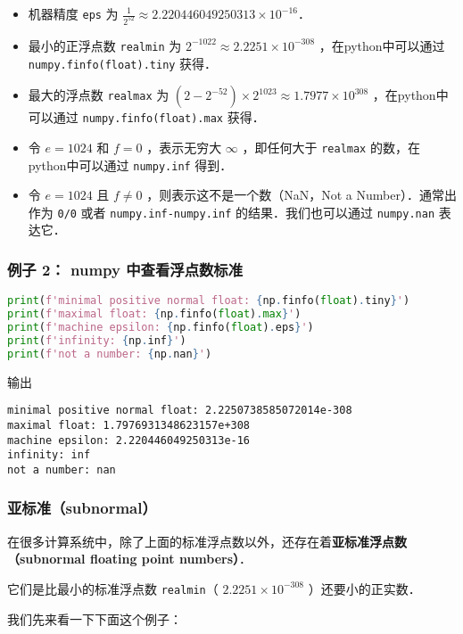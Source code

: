 \begin{itemize}
\item 机器精度 \verb|eps| 为  $\frac{1}{2^{52}}\approx 2.220446049250313\times10^{-16}$．
\item 最小的正浮点数 \verb|realmin| 为  $2^{-1022}\approx2.2251\times10^{-308}$  ，在python中可以通过 \verb|numpy.finfo(float).tiny| 获得．
\item 最大的浮点数 \verb|realmax| 为 $(2-2^{-52})\times2^{1023}\approx1.7977\times10^{308}$  ，在python中可以通过 \verb|numpy.finfo(float).max| 获得．
\item 令  $e=1024$  和  $f=0$  ，表示无穷大  $\infty$  ，即任何大于 \verb|realmax| 的数，在python中可以通过 \verb|numpy.inf| 得到．
\item 令  $e=1024$  且  $f\neq0$  ，则表示这不是一个数（NaN，Not a Number）．通常出作为 \verb|0/0| 或者 \verb|numpy.inf-numpy.inf| 的结果．我们也可以通过 \verb|numpy.nan| 表达它．
\end{itemize}

\subsubsection{例子 2： numpy 中查看浮点数标准}

\begin{lstlisting}[language=python]
print(f'minimal positive normal float: {np.finfo(float).tiny}')
print(f'maximal float: {np.finfo(float).max}')
print(f'machine epsilon: {np.finfo(float).eps}')
print(f'infinity: {np.inf}')
print(f'not a number: {np.nan}')
\end{lstlisting}

输出
\begin{lstlisting}[language=pythonC]
minimal positive normal float: 2.2250738585072014e-308 
maximal float: 1.7976931348623157e+308 
machine epsilon: 2.220446049250313e-16 
infinity: inf 
not a number: nan
\end{lstlisting}

\subsubsection{亚标准（subnormal）}

在很多计算系统中，除了上面的标准浮点数以外，还存在着\textbf{亚标准浮点数（subnormal floating point numbers）}． 

它们是比最小的标准浮点数 \verb|realmin|（  $2.2251\times10^{-308}$  ）还要小的正实数．

我们先来看一下下面这个例子：

